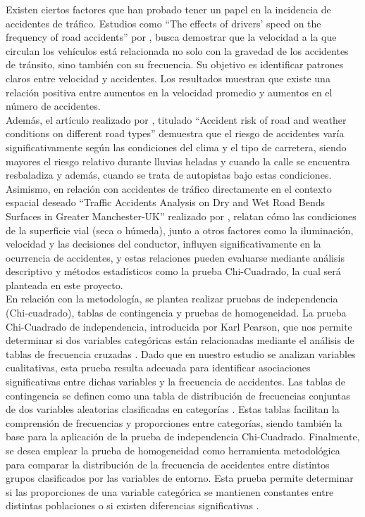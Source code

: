 \documentclass[12pt]{article}
\begin{document}
Existen ciertos factores que han probado tener un papel en la incidencia de accidentes de tráfico. 
Estudios como “The effects of drivers' speed on the frequency of road accidents” por \textcite{TAYLOR2000},  
busca demostrar que la velocidad a la que circulan los vehículos está relacionada no solo con la gravedad de los accidentes de tránsito,
sino también con su frecuencia. Su objetivo es identificar patrones claros entre velocidad y accidentes. Los resultados muestran 
que existe una relación positiva entre aumentos en la velocidad promedio y aumentos en el número de accidentes. \\

Además, el artículo realizado por \textcite{MALIN2019}, titulado “Accident risk of road and weather conditions 
on different road types” demuestra que el riesgo de accidentes varía significativamente según las 
condiciones del clima y el tipo de carretera, siendo mayores el riesgo relativo durante lluvias heladas y cuando la calle se encuentra resbaladiza y además, 
cuando se trata de autopistas bajo estas condiciones. Asimismo, en relación con accidentes de tráfico directamente en el contexto espacial deseado 
“Traffic Accidents Analysis on Dry and Wet Road Bends Surfaces in Greater Manchester-UK” realizado por \textcite{KARZAN2017},
relatan cómo las condiciones de la superficie vial (seca o húmeda), junto a otros factores como la iluminación, velocidad y 
las decisiones del conductor, influyen significativamente en la ocurrencia de accidentes, y estas relaciones pueden evaluarse
mediante análisis descriptivo y métodos estadísticos como la prueba Chi-Cuadrado, la cual será planteada en este proyecto. \\ 

En relación con la metodología, se plantea realizar pruebas de independencia (Chi-cuadrado), 
tablas de contingencia y pruebas de homogeneidad. La prueba Chi-Cuadrado de independencia, introducida por Karl Pearson, 
que nos permite determinar si dos variables categóricas están relacionadas mediante el análisis de tablas de frecuencia cruzadas \parencite{LASTRE2019}.  
Dado que en nuestro estudio se analizan variables cualitativas, esta prueba resulta adecuada para identificar asociaciones 
significativas entre dichas variables y la frecuencia de accidentes. Las tablas de contingencia se definen como una tabla 
de distribución de frecuencias conjuntas de dos variables aleatorias clasificadas en categorías \parencite{LASTRE2019}. 
Estas tablas facilitan la comprensión de frecuencias y proporciones entre categorías, siendo también la base para la 
aplicación de la prueba de independencia Chi-Cuadrado. Finalmente, se desea emplear la prueba de homogeneidad como 
herramienta metodológica para comparar la distribución de la frecuencia de accidentes entre distintos grupos 
clasificados por las variables de entorno. Esta prueba permite determinar si las proporciones de una variable 
categórica se mantienen constantes entre distintas poblaciones o si existen diferencias significativas \parencite{MONTANA2025}. \\
\end{document}
